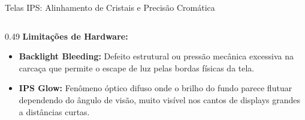 \begin{frame}{Telas IPS: Alinhamento de Cristais e Precisão Cromática}
{\begin{columns}[T]
            \begin{column}{0.49\textwidth}    
                \textbf{Limitações de Hardware:}
                \begin{itemize}
                    \setlength{\itemsep}{1pt}
                    \item \textbf{Backlight Bleeding:} Defeito estrutural ou pressão mecânica excessiva na carcaça que permite o escape de luz pelas bordas físicas da tela.
                    \item \textbf{IPS Glow:} Fenômeno óptico difuso onde o brilho do fundo parece flutuar dependendo do ângulo de visão, muito visível nos cantos de displays grandes a distâncias curtas.
                \end{itemize}
            \end{column}
        \end{columns}
    }
\end{frame}

